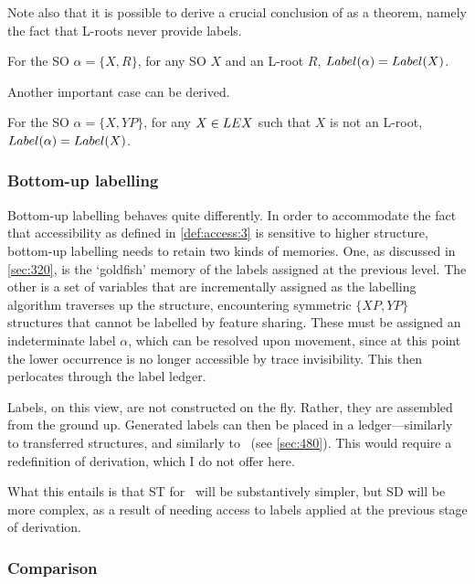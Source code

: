 Note also that it is possible to derive a crucial conclusion of \textcite{ChomskyN_2015} as a theorem, namely the fact that L-roots never provide labels.

\begin{theorem}\label{thm:rootinvis}
    For the SO $\alpha = \{X, R\}$, for any SO $X$ and an L-root $R$, $Label(\alpha)=Label(X)$.
\end{theorem}
\noindent
Another important case can be derived.

\begin{theorem}\label{thm:standardcase}
    For the SO $\alpha = \{X, YP\}$, for any $X \in LEX$ such that $X$ is not an L-root, $Label(\alpha)=Label(X)$.
\end{theorem}

\subsubsection{Bottom-up labelling}\label{sec:472}

Bottom-up labelling behaves quite differently. In order to accommodate the fact that accessibility as defined in \autoref{def:access:3} is sensitive to higher structure, bottom-up labelling needs to retain two kinds of memories. One, as discussed in \autoref{sec:320}, is the `goldfish' memory of the labels assigned at the previous level. The other is a set of variables that are incrementally assigned as the labelling algorithm traverses up the structure, encountering symmetric $\{XP, YP\}$ structures that cannot be labelled by feature sharing. These must be assigned an indeterminate label $\alpha$, which can be resolved upon movement, since at this point the lower occurrence is no longer accessible by trace invisibility. This then perlocates through the label ledger.

Labels, on this view, are not constructed on the fly. Rather, they are assembled from the ground up. Generated labels can then be placed in a ledger---similarly to transferred structures, and similarly to \Agree\ (see \autoref{sec:480}). This would require a redefinition of derivation, which I do not offer here.

What this entails is that ST for \LabelBU\ will be substantively simpler, but SD will be more complex, as a result of needing access to labels applied at the previous stage of derivation. 

\subsubsection{Comparison}\label{sec:473}

